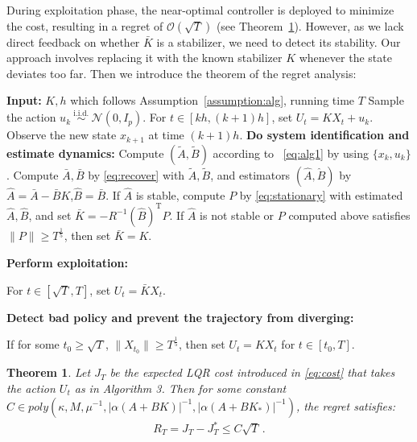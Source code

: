 \documentclass{article}
\newtheorem{theorem}{Theorem}
\theoremstyle{definition}
\begin{document}
During exploitation phase, the near-optimal controller is deployed to minimize the cost, resulting in a regret of $\mathcal{O}(\sqrt{T})$ (see Theorem~\ref{thm:total regret}). However, as we lack direct feedback on whether $\bar{K}$ is a stabilizer, we need to detect its stability. Our approach involves replacing it with the known stabilizer $K$ whenever the state deviates too far. Then we introduce the theorem of the regret analysis:



\begin{algorithm}[t]\caption{Continuous online control algorithm} \label{alg:3}
\begin{algorithmic}
    \STATE \textbf{Input:} $K,h$ which follows Assumption~\ref{assumption:alg}, running time $T$
    \STATE Sample the action $u_{k}\stackrel{\text { i.i.d. }}{\sim}\mathcal{N}\left(0, I_p\right)$.
    \STATE For $t\in[kh,(k+1)h]$, set $U_{t}=KX_{t}+u_{k}$.
    \STATE Observe the new state $x_{k+1}$ at time $(k+1)h$.
    \ENDFOR
    \STATE \textbf{Do system identification and estimate dynamics:}
    \STATE Compute $(\widetilde{A},\widetilde{B})$ according to ~\eqref{eq:alg1} by using $\{x_{k},u_{k}\}$.
    \STATE Compute $\bar{A},\bar{B}$ by \eqref{eq:recover} with $\widetilde{A} ,\widetilde{B}$, and  estimators $(\hat{A},\hat{B})$ by $\hat{A}=\bar{A}-\bar{B}K$,$\hat{B}=\bar{B}$.
    \STATE If $\hat{A}$ is stable, compute $P$ by \eqref{eq:stationary} with estimated $\hat{A},\hat{B}$, and set $\bar{K}=-R^{-1}(\hat{B})^{\mathrm{T}}P$.
    \STATE If $\hat{A}$ is not stable or $P$ computed above satisfies $\|P\|\geq T^{\frac{1}{5}}$, then set $\bar{K}=K$.
		
    \STATE \textbf{Perform exploitation:}
		
    \STATE For $t\in [\sqrt{T},T]$, set $U_{t}=\bar{K} X_{t}$.
		
    \STATE \textbf{Detect bad policy and prevent the trajectory from diverging:}
		
    \STATE If for some $t_{0}\geq \sqrt{T}$, $\|X_{t_{0}}\|\geq {T}^{\frac{1}{5}}$, then set $U_{t}=KX_{t}$ for $t\in[t_{0},T]$.
 	\end{algorithmic}
 \end{algorithm}


\begin{theorem}\label{thm:total regret}
Let $J_{T}$ be the expected LQR cost introduced in \eqref{eq:cost} that takes the action $U_{t}$ as in Algorithm 3. Then for some constant $C\in poly\left(\kappa,M, \mu^{-1}, \vert\alpha(A+BK)\vert^{-1},  \vert\alpha(A+BK_{*})\vert^{-1}\right)$, the regret satisfies:
 \begin{align*}
     R_{T}=J_{T}-J^{*}_{T}\leq C\sqrt{T}\,.
 \end{align*}
\end{theorem}
\end{document}
